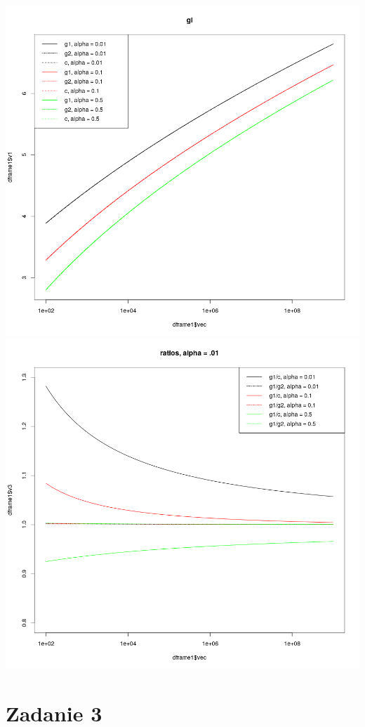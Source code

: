 \documentclass[a4paper,11pt]{article}
\begin{document}
\includegraphics[scale=.3]{plot3.png} 
\includegraphics[scale=.3]{plot4.png}


\section{Zadanie 3}
\end{document}
